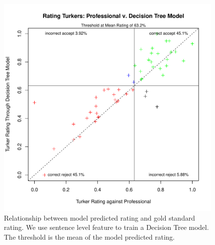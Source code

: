 \documentclass[11pt]{article}
\begin{document}
\begin{figure}[htbp]
  \centering
  \includegraphics[width=\linewidth]{Senfeature/rrankingsenfeatureDT}
  \caption{Relationship between model predicted rating and gold standard rating. We use sentence level feature to train a Decision Tree model. The threshold is the mean of the model predicted rating.}
    \label{fdtsenrrating1}
\end{figure}
\end{document}
